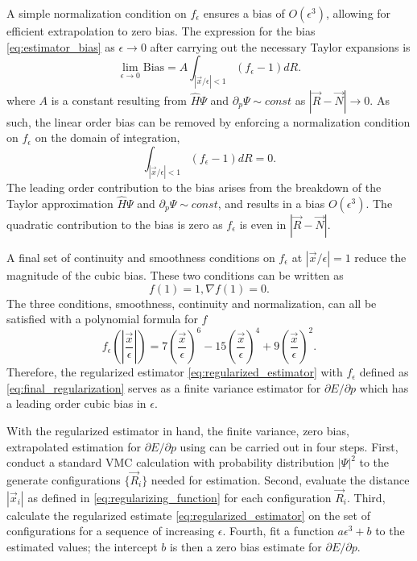\documentclass[twocolumn]{revtex4-1}
\begin{document}
A simple normalization condition on $f_\epsilon$ ensures a bias of $O(\epsilon^3)$, allowing for efficient extrapolation to zero bias.
The expression for the bias \eqref{eq:estimator_bias} as $\epsilon \rightarrow 0$ after carrying out the necessary Taylor expansions is
$$
\lim_{\epsilon\rightarrow 0}\text{Bias} =  A \int_{|\vec{x}/\epsilon|< 1} (f_\epsilon - 1) dR.
$$
where $A$ is a constant resulting from $\hat{H}\Psi$ and $\partial_p \Psi \sim const$ as $|\vec{R}-\vec{N}|\rightarrow 0$.
As such, the linear order bias can be removed by enforcing a normalization condition on $f_\epsilon$ on the domain of integration, 
\begin{equation}
\int_{|\vec{x}/\epsilon|< 1} (f_\epsilon - 1) dR = 0.
\label{eq:normalization_condition}
\end{equation}
The leading order contribution to the bias arises from the breakdown of the Taylor approximation $\hat{H}\Psi$ and $\partial_p \Psi \sim const$, and results in a bias $O(\epsilon^3)$.
The quadratic contribution to the bias is zero as $f_\epsilon$ is even in $|\vec{R}-\vec{N}|$.

A final set of continuity and smoothness conditions on $f_\epsilon$ at $|\vec{x}/\epsilon| = 1$ reduce the magnitude of the cubic bias.
These two conditions can be written as 
\begin{equation}
f(1) = 1, \nabla f(1) = 0.
\label{eq:smoothness_condition}
\end{equation}
The three conditions, smoothness, continuity and normalization, can all be satisfied with a polynomial formula for $f$
\begin{equation}
f_\epsilon(|\frac{\vec{x}}{\epsilon}|) = 7(\frac{\vec{x}}{\epsilon})^6 - 15(\frac{\vec{x}}{\epsilon})^4 + 9(\frac{\vec{x}}{\epsilon})^2.
\label{eq:final_regularization}
\end{equation}
Therefore, the regularized estimator \eqref{eq:regularized_estimator} with $f_\epsilon$ defined as \eqref{eq:final_regularization} serves as a finite variance estimator for $\partial E/\partial p$ which has a leading order cubic bias in $\epsilon$.

With the regularized estimator in hand, the finite variance, zero bias, extrapolated estimation for $\partial E/\partial p$ using can be carried out in four steps.
First, conduct a standard VMC calculation with probability distribution $|\Psi|^2$ to the generate configurations $\{\vec{R}_i\}$ needed for estimation.
Second, evaluate the distance $|\vec{x}_i|$ as defined in \eqref{eq:regularizing_function} for each configuration $\vec{R}_i$.
Third, calculate the regularized estimate \eqref{eq:regularized_estimator} on the set of configurations for a sequence of increasing $\epsilon$.
Fourth, fit a function $a\epsilon^3 + b$ to the estimated values; the intercept $b$ is then a zero bias estimate for $\partial E/\partial p.$
\end{document}
